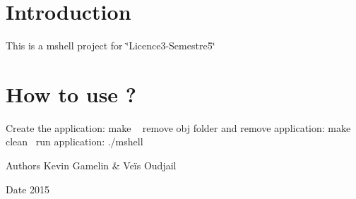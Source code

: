 \hypertarget{index_intro_sec}{}\section{Introduction}\label{index_intro_sec}
This is a mshell project for \char`\"{}\+Licence3-\/\+Semestre5\char`\"{}\hypertarget{index_install_sec}{}\section{How to use ?}\label{index_install_sec}
Create the application\+: make ~\newline
 remove obj folder and remove application\+: make clean~\newline
 run application\+: ./mshell~\newline
 \begin{DoxyAuthor}{Authors}
Kevin Gamelin \& Veïs Oudjail 
\end{DoxyAuthor}
\begin{DoxyDate}{Date}
2015 
\end{DoxyDate}
